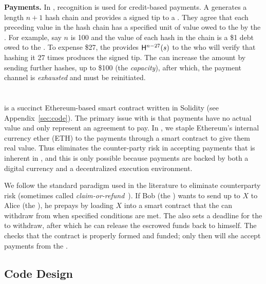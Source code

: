 \textbf{Payments.} In \pw, recognition is used for credit-based payments. A \make generates a length $n+1$ hash chain and provides a signed tip to a \take. They agree that each preceding value in the hash chain has a specified unit of value owed to the \take by the \make. For example, say $n$ is 100 and the value of each hash in the chain is a \$1 debt owed to the \take. To expense \$27, the \make provides $\mathsf{H}^{n-27}(s)$ to the \take who will verify that hashing it 27 times produces the signed tip. The \make can increase the amount by sending further hashes, up to \$100 (the \textit{capacity}), after which, the payment channel is \textit{exhausted} and must be reinitiated.


\section{\ew}

\ew is a succinct Ethereum-based smart contract written in Solidity (see Appendix~\ref{sec:code}). The primary issue with \pw is that payments have no actual value and only represent an agreement to pay. In \ew, we staple Ethereum's internal currency ether (ETH) to the payments through a smart contract to give them real value. Thus \ew eliminates the counter-party risk in accepting payments that is inherent in \pw, and this is only possible because payments are backed by both a digital currency and a decentralized execution environment. 

We follow the standard paradigm used in the literature to eliminate counterparty risk (sometimes called \textit{claim-or-refund}~\cite{BK14}). If Bob (the \make) wants to send up to $X$ \eth to Alice (the \take), he prepays by loading $X$ \eth into a smart contract that the \take can withdraw from when specified conditions are met. The \make also sets a deadline for the \take to withdraw, after which he can release the escrowed funds back to himself. The \take checks that the contract is properly formed and funded; only then will she accept payments from the \make.

\subsection{Code Design}

